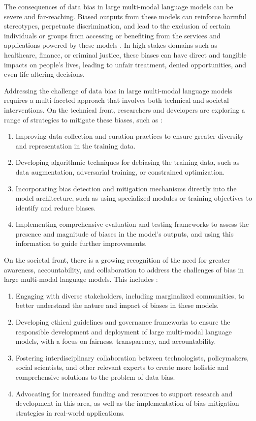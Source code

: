 \documentclass[11pt]{article}
\providecommand{\tightlist}{%
  \setlength{\itemsep}{0pt}\setlength{\parskip}{0pt}}
\begin{document}
The consequences of data bias in large multi-modal language models can be severe and far-reaching. Biased outputs from these models can reinforce harmful stereotypes, perpetuate discrimination, and lead to the exclusion of certain individuals or groups from accessing or benefiting from the services and applications powered by these models \cite{ref323}. In high-stakes domains such as healthcare, finance, or criminal justice, these biases can have direct and tangible impacts on people's lives, leading to unfair treatment, denied opportunities, and even life-altering decisions.

Addressing the challenge of data bias in large multi-modal language models requires a multi-faceted approach that involves both technical and societal interventions. On the technical front, researchers and developers are exploring a range of strategies to mitigate these biases, such as \cite{ref324}:

\begin{enumerate}
\def\labelenumi{\arabic{enumi}.}
\tightlist
\item
  Improving data collection and curation practices to ensure greater diversity and representation in the training data.
\item
  Developing algorithmic techniques for debiasing the training data, such as data augmentation, adversarial training, or constrained optimization.
\item
  Incorporating bias detection and mitigation mechanisms directly into the model architecture, such as using specialized modules or training objectives to identify and reduce biases.
\item
  Implementing comprehensive evaluation and testing frameworks to assess the presence and magnitude of biases in the model's outputs, and using this information to guide further improvements.
\end{enumerate}

On the societal front, there is a growing recognition of the need for greater awareness, accountability, and collaboration to address the challenges of bias in large multi-modal language models. This includes \cite{ref255}:

\begin{enumerate}
\def\labelenumi{\arabic{enumi}.}
\tightlist
\item
  Engaging with diverse stakeholders, including marginalized communities, to better understand the nature and impact of biases in these models.
\item
  Developing ethical guidelines and governance frameworks to ensure the responsible development and deployment of large multi-modal language models, with a focus on fairness, transparency, and accountability.
\item
  Fostering interdisciplinary collaboration between technologists, policymakers, social scientists, and other relevant experts to create more holistic and comprehensive solutions to the problem of data bias.
\item
  Advocating for increased funding and resources to support research and development in this area, as well as the implementation of bias mitigation strategies in real-world applications.
\end{enumerate}
\end{document}
